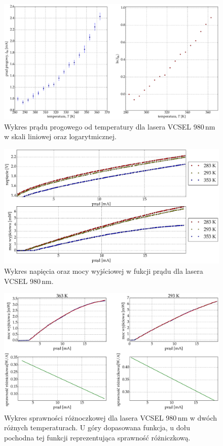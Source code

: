 \begin{figure}
\center
  \includegraphics[scale=0.30]{plot980/plot_temp_i_th_log_lin.eps}
  \caption{Wykres prądu progowego od temperatury dla lasera VCSEL 980\,nm w skali liniowej oraz logarytmicznej.}
  \label{fig:plot_temp_i_th_log_lin_980}
\end{figure}
\begin{figure}
\center
  \includegraphics[scale=0.30]{plot980/plot_i_v_i_l.eps}
  \caption{Wykres napięcia oraz mocy wyjściowej w fukcji prądu dla lasera VCSEL 980\,nm.}
  \label{fig:plot_i_v_i_l_980}
\end{figure}
\begin{figure}
\center
  \includegraphics[scale=0.30]{plot980/plot_eff_via_current4.eps}
  \caption{Wykres sprawności różnoczkowej dla lasera VCSEL 980\,nm w dwóch różnych temperaturach. U góry dopasowana funkcja,
u dołu pochodna tej funkcji reprezentująca sprawność różniczkową.}
  \label{fig:plot_eff_via_current4_980}
\end{figure}
